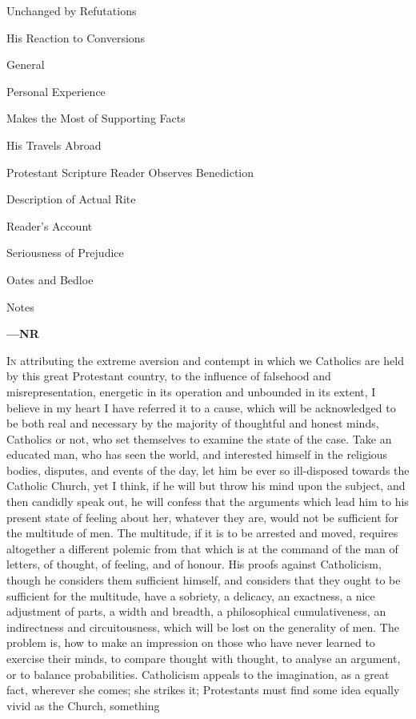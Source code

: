 Unchanged by
Refutations

His Reaction to
Conversions

General

Personal
Experience

Makes the Most
of Supporting Facts

His Travels Abroad

Protestant Scripture Reader
Observes Benediction

Description of Actual
Rite

Reader's
Account

Seriousness of
Prejudice

Oates and Bedloe

Notes

\textbf{—NR}

I\textsc{n} attributing the extreme aversion and contempt in
which we Catholics are held by this great Protestant
country, to the influence of falsehood and
misrepresentation, energetic in its operation and
unbounded in its extent, I believe in my heart I have
referred it to a cause, which will be acknowledged to be
both real and necessary by the majority of thoughtful and
honest minds, Catholics or not, who set themselves to
examine the state of the case. Take an educated man, who
has seen the world, and interested himself in the
religious bodies, disputes, and events of the day, let
him be ever so ill-disposed towards the Catholic Church,
yet I think, if he will but throw his mind upon the
subject, and then candidly speak out, he will confess
that the arguments which lead him to his present state of
feeling about her, whatever they are, would not be
sufficient for the multitude of men. The multitude, if it
is to be arrested and moved, requires altogether a
different polemic from that which is at the command of
the man of letters, of thought, of feeling, and of
honour. His proofs against Catholicism, though he
considers them sufficient himself, and considers that
they ought to be sufficient for the multitude, have a
sobriety, a delicacy, an exactness, a nice adjustment of
parts, a width and breadth, a philosophical
cumulativeness, an indirectness and circuitousness, which
will be lost on the generality of men. The problem is,
how to make an impression on those who have never learned
to exercise their minds, to compare thought with thought,
to analyse an argument, or to balance probabilities.
Catholicism appeals to the imagination, as a great fact,
wherever she comes; she strikes it; Protestants must find
some idea equally vivid as the Church, something

